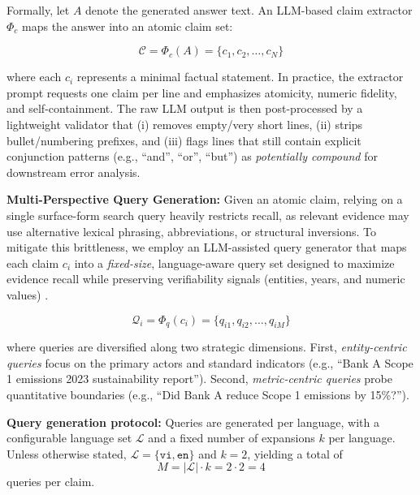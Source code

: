\documentclass[sn-mathphys, oneside]{sn-jnl}
\begin{document}
Formally, let $A$ denote the generated answer text. An LLM-based claim extractor $\Phi_{c}$ maps the answer into an atomic claim set:

\begin{equation}
    \mathcal{C} = \Phi_{c}(A) = \{c_1, c_2, \ldots, c_N\}
    \label{eq:claim_extract}
\end{equation}

where each $c_i$ represents a minimal factual statement. In practice, the extractor prompt requests one claim per line and emphasizes atomicity, numeric fidelity, and self-containment. The raw LLM output is then post-processed by a lightweight validator that (i) removes empty/very short lines, (ii) strips bullet/numbering prefixes, and (iii) flags lines that still contain explicit conjunction patterns (e.g., ``and'', ``or'', ``but'') as \emph{potentially compound} for downstream error analysis.

\textbf{Multi-Perspective Query Generation:} Given an atomic claim, relying on a single surface-form search query heavily restricts recall, as relevant evidence may use alternative lexical phrasing, abbreviations, or structural inversions. To mitigate this brittleness, we employ an LLM-assisted query generator that maps each claim $c_i$ into a \emph{fixed-size}, language-aware query set designed to maximize evidence recall while preserving verifiability signals (entities, years, and numeric values) \cite{wei2024safe}.

\begin{equation}
    \mathcal{Q}_i = \Phi_q(c_i) = \{q_{i1}, q_{i2}, \ldots, q_{iM}\}
    \label{eq:query_set}
\end{equation}

where queries are diversified along two strategic dimensions. First, \textit{entity-centric queries} focus on the primary actors and standard indicators (e.g., ``Bank A Scope 1 emissions 2023 sustainability report''). Second, \textit{metric-centric queries} probe quantitative boundaries (e.g., ``Did Bank A reduce Scope 1 emissions by 15\%?'').

\textbf{Query generation protocol:} Queries are generated per language, with a configurable language set $\mathcal{L}$ and a fixed number of expansions $k$ per language. Unless otherwise stated, $\mathcal{L}=\{\texttt{vi},\texttt{en}\}$ and $k=2$, yielding a total of
\begin{equation}
    M = |\mathcal{L}| \cdot k = 2 \cdot 2 = 4
    \label{eq:query_count}
\end{equation}
queries per claim.
\end{document}
